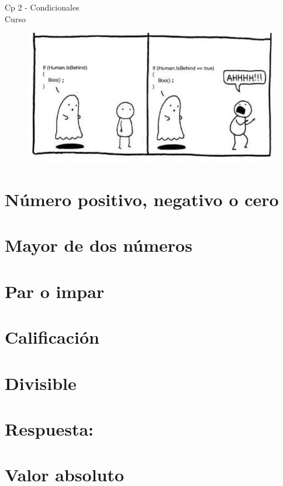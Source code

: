 \begin{center}
    \begin{large}
    Cp 2 - Condicionales\\
    Curso \academicyear\\
    \end{large}
    \begin{figure}[h]
    	\centering
    	\includegraphics[width=0.6\linewidth]{cp3/conditional.jpg}
    \end{figure}
\end{center}

\section{Número positivo, negativo o cero}


\section{Mayor de dos números}


\section{Par o impar}


\section{Calificación}


\section{Divisible}

\ifshowanswers
\section*{Respuesta:}

\fi

\section{Valor absoluto}

\ifshowanswers
